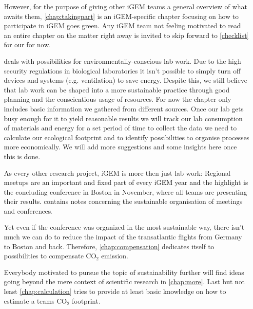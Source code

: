 However, for the purpose of giving other iGEM teams a general overview of what awaits them, \cref{chap:takingpart} is an iGEM-specific chapter focusing on how to participate in iGEM goes green. Any iGEM team not feeling motivated to read an entire chapter on the matter right away is invited to skip forward to \cref{checklist} for our  for now.

 deals with possibilities for environmentally-conscious lab work. Due to the high security regulations in biological laboratories it isn’t possible to simply turn off devices and systems (e.g. ventilation) to save energy. Despite this, we still believe that lab work can be shaped into a more sustainable practice through good planning and the conscientious usage of resources. For now the chapter only includes basic information we gathered from different sources. Once our lab gets busy enough for it to yield reasonable results we will track our lab consumption of materials and energy for a set period of time to collect the data we need to calculate our ecological footprint and to identify possibilities to organise processes more economically. We will add more suggestions and some insights here once this is done.

As every other research project, iGEM is more then just lab work: Regional meetups are an important and fixed part of every iGEM year and the highlight is the concluding conference in Boston in November, where all teams are presenting their results.  contains notes concerning the sustainable organisation of meetings and conferences. 

Yet even if the conference was organized in the most sustainable way, there isn't much we can do to reduce the impact of the transatlantic flights from Germany to Boston and back. Therefore, \cref{chap:compensation} dedicates itself to possibilities to compensate CO$_2$ emission.

Everybody motivated to pursue the topic of sustainability further will find ideas going beyond the mere context of scientific research in \cref{chap:more}. Last but not least \cref{chap:calculation} tries to provide at least basic knowledge on how to estimate a teams CO$_2$ footprint.
